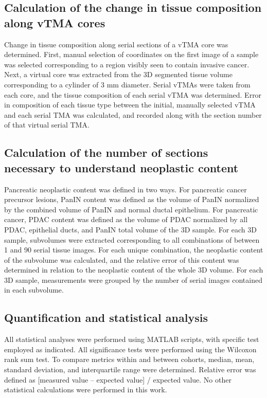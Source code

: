 \begin{refsection}
    \subsection{Calculation of the change in tissue composition along vTMA cores}
    Change in tissue composition along serial sections of a vTMA core was determined. First, manual selection of coordinates on the first image of a sample was selected corresponding to a region visibly seen to contain invasive cancer. Next, a virtual core was extracted from the 3D segmented tissue volume corresponding to a cylinder of 3 mm diameter. Serial vTMAs were taken from each core, and the tissue composition of each serial vTMA was determined. Error in composition of each tissue type between the initial, manually selected vTMA and each serial TMA was calculated, and recorded along with the section number of that virtual serial TMA. 
    
    \subsection{Calculation of the number of sections necessary to understand neoplastic content}
    Pancreatic neoplastic content was defined in two ways. For pancreatic cancer precursor lesions, PanIN content was defined as the volume of PanIN normalized by the combined volume of PanIN and normal ductal epithelium. For pancreatic cancer, PDAC content was defined as the volume of PDAC normalized by all PDAC, epithelial ducts, and PanIN total volume of the 3D sample. For each 3D sample, subvolumes were extracted corresponding to all combinations of between 1 and 90 serial tissue images. For each unique combination, the neoplastic content of the subvolume was calculated, and the relative error of this content was determined in relation to the neoplastic content of the whole 3D volume. For each 3D sample, measurements were grouped by the number of serial images contained in each subvolume.
    
    
    
    \subsection{Quantification and statistical analysis}
    All statistical analyses were performed using MATLAB scripts, with specific test employed as indicated. All significance tests were performed using the Wilcoxon rank sum test. To compare metrics within and between cohorts, median, mean, standard deviation, and interquartile range were determined. Relative error was defined as [measured value – expected value] / expected value. No other statistical calculations were performed in this work.
    
    \par
    \printbibliography[heading=subbibliography, title={References}]
\end{refsection}